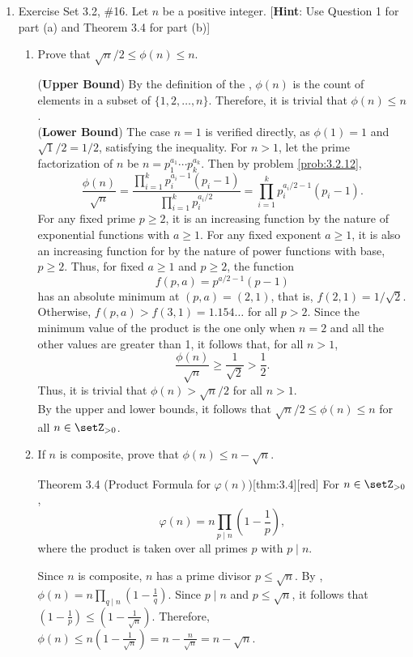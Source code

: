 \begin{enumerate}
  \newpage
  \item Exercise Set 3.2, \#16.
  Let $n$ be a positive integer.
  [\textbf{Hint}: Use Question 1 for part (a) and Theorem 3.4 for part (b)]
  \begin{enumerate}
    \item Prove that $\sqrt{n} / 2 \leq \phi(n) \leq n$.
    \begin{subprove}
      (\textbf{Upper Bound}) By the definition of the ,
      $\phi(n)$ is the count of elements in a subset of $\{1, 2, \ldots, n\}$.
      Therefore, it is trivial that $\phi(n) \leq n$.\vspace*{10px}\\
      (\textbf{Lower Bound}) The case $n=1$ is verified directly, as $\phi(1) = 1$ and $\sqrt{1}/2 = 1/2$,
      satisfying the inequality. For $n>1$, let the prime factorization of $n$ be $n = p_1^{a_1} \cdots p_k^{a_k}$.
      Then by problem \ref{prob:3.2.12},
      \[
        \frac{\phi(n)}{\sqrt{n}} = \frac{\prod_{i=1}^k p_i^{a_i-1}(p_i-1)}{\prod_{i=1}^k p_i^{a_i/2}} = \prod_{i=1}^k p_i^{a_i/2 - 1}(p_i-1).
      \]
      For any fixed prime $p\ge 2$, it is an increasing function by the nature of exponential functions with $a \ge 1$.
      For any fixed exponent $a \ge 1$, it is also an increasing function for by the nature of power functions with base, $p \ge 2$.
      Thus, for fixed $a \ge 1$ and $p \ge 2$, the function
      \[
        f(p,a) = p^{a/2 - 1}(p - 1)
      \]
      has an absolute minimum at $(p,a)=(2,1)$, that is, $f(2,1)=1/\sqrt{2}$. Otherwise, 
      $f(p,a) > f(3,1) = 1.154\dots$ for all $p > 2$. Since the minimum value of the product
      is the one only when $n=2$ and all the other values are greater than 1, it follows that, for all $n>1$,
      \[
        \frac{\phi(n)}{\sqrt{n}} \ge \frac{1}{\sqrt{2}} > \frac{1}{2}.
      \]
      Thus, it is trivial that $\phi(n) > \sqrt{n}/2$ for all $n>1$.\vspace*{10px}\\
      By the upper and lower bounds, it follows that $\sqrt{n}/2 \leq \phi(n) \leq n$ for all $n \in \setZ_{>0}$.
    \end{subprove}
    \item If $n$ is composite, prove that $\phi(n) \leq n-\sqrt{n}$.
    \begin{define}{Theorem 3.4 (Product Formula for $\varphi(n)$)}[thm:3.4][red]
    For $n \in \setZ_{>0}$,
    \[
    \varphi(n)=n \prod_{p \mid n}\left(1-\frac{1}{p}\right),
    \]
    where the product is taken over all primes $p$ with $p \mid n$.
    \end{define}
    \begin{subprove}
      Since $n$ is composite, $n$ has a prime divisor $p \leq \sqrt{n}$.
      By , $\phi(n) = n\prod_{q\mid n}(1-\frac{1}{q})$.
      Since $p \mid n$ and $p \leq \sqrt{n}$, it follows that $(1-\frac{1}{p}) \leq (1-\frac{1}{\sqrt{n}})$.
      Therefore, $\phi(n) \leq n(1-\frac{1}{\sqrt{n}}) = n - \frac{n}{\sqrt{n}} = n - \sqrt{n}$.
    \end{subprove}
  \end{enumerate}
\end{enumerate}

